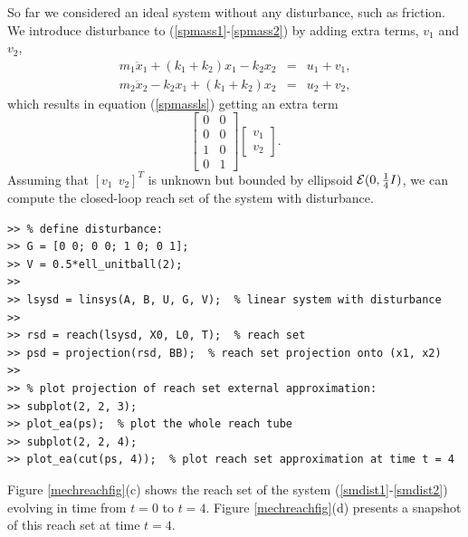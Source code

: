 \documentclass{report}
\newcommand{\EE}{{\cal E}}
\begin{document}
So far we considered an ideal system without any disturbance, such as friction.
We introduce disturbance to (\ref{spmass1}-\ref{spmass2}) by adding extra
terms, $v_1$ and $v_2$,
\begin{eqnarray}
m_1\ddot{x}_1+(k_1+k_2)x_1-k_2x_2 & = & u_1 + v_1, \label{smdist1}\\
m_2\ddot{x}_2-k_2x_1+(k_1+k_2)x_2 & = & u_2 + v_2, \label{smdist2}
\end{eqnarray}
which results in equation (\ref{spmassls}) getting an extra term
\[ \left[\begin{array}{cc}
0 & 0\\
0 & 0\\
1 & 0\\
0 & 1\end{array}\right]\left[\begin{array}{c}
v_1\\
v_2\end{array}\right]. \]
Assuming that $[v_1 ~~ v_2]^T$ is unknown but bounded by ellipsoid
$\EE(0, \frac{1}{4}I)$, we can compute the closed-loop reach set of the system
with disturbance.
{\tt \begin{verbatim}
>> % define disturbance:
>> G = [0 0; 0 0; 1 0; 0 1];
>> V = 0.5*ell_unitball(2);
>>
>> lsysd = linsys(A, B, U, G, V);  % linear system with disturbance
>>
>> rsd = reach(lsysd, X0, L0, T);  % reach set
>> psd = projection(rsd, BB);  % reach set projection onto (x1, x2)
>>
>> % plot projection of reach set external approximation:
>> subplot(2, 2, 3);
>> plot_ea(ps);  % plot the whole reach tube
>> subplot(2, 2, 4);
>> plot_ea(cut(ps, 4));  % plot reach set approximation at time t = 4
\end{verbatim}}
Figure \ref{mechreachfig}(c) shows the reach set of the system
(\ref{smdist1}-\ref{smdist2}) evolving in time from $t=0$ to $t=4$.
Figure \ref{mechreachfig}(d) presents a snapshot of this reach set at time
$t=4$.
\end{document}
